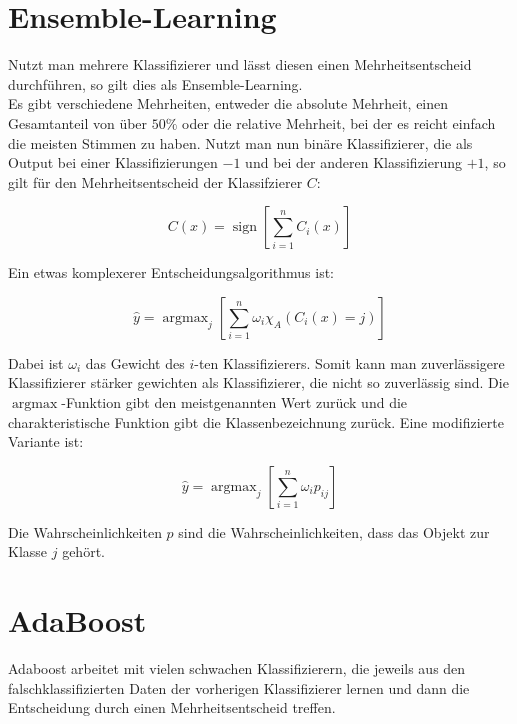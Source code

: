 \documentclass[11pt]{article} %
\DeclareMathOperator{\sign}{sign}
\DeclareMathOperator{\argmax}{argmax}
\begin{document}
\section{Ensemble-Learning}
Nutzt man mehrere Klassifizierer und lässt diesen einen Mehrheitsentscheid durchführen, so gilt dies als Ensemble-Learning.\\
Es gibt verschiedene Mehrheiten, entweder die absolute Mehrheit, einen Gesamtanteil von über $50\% $ oder die relative Mehrheit, bei der es reicht einfach die meisten Stimmen zu haben. Nutzt man nun binäre Klassifizierer, die als Output bei einer Klassifizierungen $-1$ und bei der anderen Klassifizierung $+1$, so gilt für den Mehrheitsentscheid der Klassifzierer $C$:

\begin{equation}
C(x) = \sign[\sum_{i=1}^n C_i(x)]
\end{equation}

Ein etwas komplexerer Entscheidungsalgorithmus ist:

\begin{equation}
\hat y = \argmax_j[\sum_{i=1}^n \omega_i \chi_A (C_i(x)=j)]
\end{equation}

Dabei ist $\omega_i$ das Gewicht des $i$-ten Klassifizierers. Somit kann man zuverlässigere Klassifizierer stärker gewichten als Klassifizierer, die
nicht so zuverlässig sind. Die $\argmax$-Funktion gibt den meistgenannten Wert zurück und die charakteristische Funktion gibt die Klassenbezeichnung zurück. Eine modifizierte Variante ist:

\begin{equation}
\hat y = \argmax_j[\sum_{i=1}^n \omega_i p_{ij}]
\end{equation}

Die Wahrscheinlichkeiten $p$ sind die Wahrscheinlichkeiten, dass das Objekt zur Klasse $j$ gehört.

\section{AdaBoost}
Adaboost arbeitet mit vielen schwachen Klassifizierern, die jeweils aus den falschklassifizierten Daten der vorherigen Klassifizierer lernen und dann die Entscheidung durch einen Mehrheitsentscheid treffen.
\end{document}
